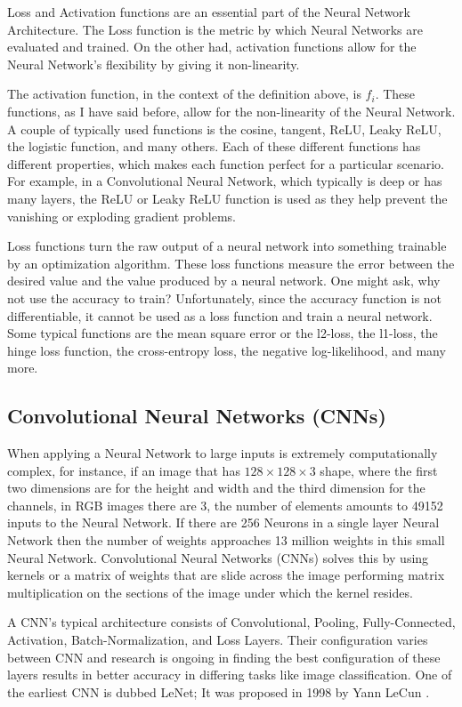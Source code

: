 Loss and Activation functions are an essential part of the Neural Network Architecture. The Loss function is the metric by which Neural Networks are evaluated and trained. On the other had, activation functions allow for the Neural Network's flexibility by giving it non-linearity.

The activation function, in the context of the definition above, is $f_i$. These functions, as I have said before, allow for the non-linearity of the Neural Network. A couple of typically used functions is the cosine, tangent, ReLU, Leaky ReLU, the logistic function, and many others. Each of these different functions has different properties, which makes each function perfect for a particular scenario. For example, in a Convolutional Neural Network, which typically is deep or has many layers, the ReLU or Leaky ReLU function is used as they help prevent the vanishing or exploding gradient problems.

Loss functions turn the raw output of a neural network into something trainable by an optimization algorithm. These loss functions measure the error between the desired value and the value produced by a neural network. One might ask, why not use the accuracy to train? Unfortunately, since the accuracy function is not differentiable, it cannot be used as a loss function and train a neural network. Some typical functions are the mean square error or the l2-loss, the l1-loss, the hinge loss function, the cross-entropy loss, the negative log-likelihood, and many more.

\subsection{Convolutional Neural Networks (CNNs)}

When applying a Neural Network to large inputs is extremely computationally complex, for instance, if an image that has $128\times 128\times 3$ shape, where the first two dimensions are for the height and width and the third dimension for the channels, in RGB images there are 3, the number of elements amounts to 49152 inputs to the Neural Network. If there are 256 Neurons in a single layer Neural Network then the number of weights approaches 13 million weights in this small Neural Network. Convolutional Neural Networks (CNNs) solves this by using kernels or a matrix of weights that are slide across the image performing matrix multiplication on the sections of the image under which the kernel resides.

A CNN's typical architecture consists of Convolutional, Pooling, Fully-Connected, Activation, Batch-Normalization, and Loss Layers. Their configuration varies between CNN and research is ongoing in finding the best configuration of these layers results in better accuracy in differing tasks like image classification. One of the earliest CNN is dubbed LeNet; It was proposed in 1998 by Yann LeCun \cite{lecun1998gradient}. 

